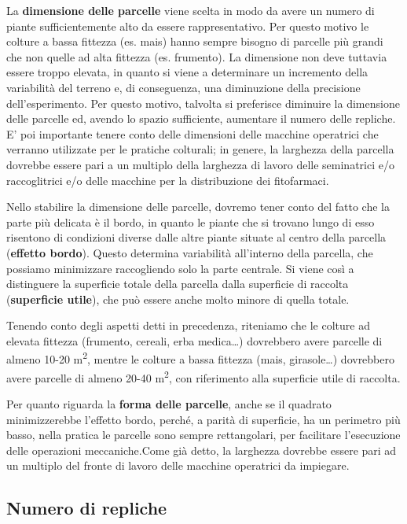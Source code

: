\documentclass[a4paper,12pt,oneside]{book}
\begin{document}
La \textbf{dimensione delle parcelle} viene scelta in modo da avere un numero di piante sufficientemente alto da essere rappresentativo. Per questo motivo le colture a bassa fittezza (es. mais) hanno sempre bisogno di parcelle più grandi che non quelle ad alta fittezza (es. frumento). La dimensione non deve tuttavia essere troppo elevata, in quanto si viene a determinare un incremento della variabilità del terreno e, di conseguenza, una diminuzione della precisione dell'esperimento. Per questo motivo, talvolta si preferisce diminuire la dimensione delle parcelle ed, avendo lo spazio sufficiente, aumentare il numero delle repliche. E' poi importante tenere conto delle dimensioni delle macchine operatrici che verranno utilizzate per le pratiche colturali; in genere, la larghezza della parcella dovrebbe essere pari a un multiplo della larghezza di lavoro delle seminatrici e/o raccoglitrici e/o delle macchine per la distribuzione dei fitofarmaci.

Nello stabilire la dimensione delle parcelle, dovremo tener conto del fatto che la parte più delicata è il bordo, in quanto le piante che si trovano lungo di esso risentono di condizioni diverse dalle altre piante situate al centro della parcella (\textbf{effetto bordo}). Questo determina variabilità all'interno della parcella, che possiamo minimizzare raccogliendo solo la parte centrale. Si viene così a distinguere la superficie totale della parcella dalla superficie di raccolta (\textbf{superficie utile}), che può essere anche molto minore di quella totale.

Tenendo conto degli aspetti detti in precedenza, riteniamo che le colture ad elevata fittezza (frumento, cereali, erba medica\ldots) dovrebbero avere parcelle di almeno 10-20 m\textsuperscript{2}, mentre le colture a bassa fittezza (mais, girasole\ldots) dovrebbero avere parcelle di almeno 20-40 m\textsuperscript{2}, con riferimento alla superficie utile di raccolta.

Per quanto riguarda la \textbf{forma delle parcelle}, anche se il quadrato minimizzerebbe l'effetto bordo, perché, a parità di superficie, ha un perimetro più basso, nella pratica le parcelle sono sempre rettangolari, per facilitare l'esecuzione delle operazioni meccaniche.Come già detto, la larghezza dovrebbe essere pari ad un multiplo del fronte di lavoro delle macchine operatrici da impiegare.

\hypertarget{numero-di-repliche}{%
\subsection{Numero di repliche}\label{numero-di-repliche}}
\end{document}
